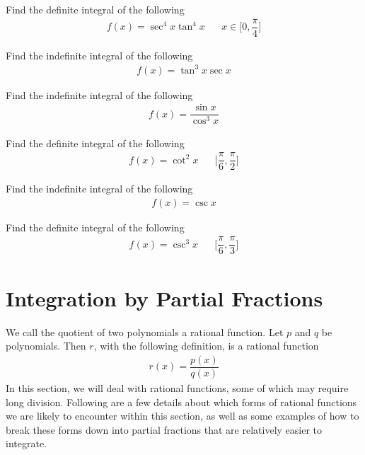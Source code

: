 \begin{exercise}
Find the definite integral of the following
\begin{align*}
    f(x) = \sec^{4} x \tan^{4} x \hspace{20pt} x \in \Big[0, \dfrac{\pi}{4} \Big]
\end{align*}
\end{exercise}

\begin{exercise}
Find the indefinite integral of the following
\begin{align*}
    f(x) = \tan^{3} x \sec x
\end{align*}
\end{exercise}

\begin{exercise}
Find the indefinite integral of the following
\begin{align*}
    f(x) = \dfrac{\sin x}{\cos^{3} x}
\end{align*}
\end{exercise}

\begin{exercise}
Find the definite integral of the following
\begin{align*}
    f(x) = \cot^{2} x \hspace{20pt} \Big[\dfrac{\pi}{6}, \dfrac{\pi}{2}\Big]
\end{align*}
\end{exercise}

\begin{exercise}
Find the indefinite integral of the following
\begin{align*}
    f(x) = \csc x
\end{align*}
\end{exercise}

\begin{exercise}
Find the definite integral of the following
\begin{align*}
    f(x) = \csc^{3} x \hspace{20pt} \Big[\dfrac{\pi}{6}, \dfrac{\pi}{3}\Big]
\end{align*}
\end{exercise}

\newpage
\section{Integration by Partial Fractions}

\begin{recall}
We call the quotient of two polynomials a rational function. Let $p$ and $q$ be polynomials. Then $r$, with the following definition, is a rational function
\begin{align*}
    r(x) = \dfrac{p(x)}{q(x)}
\end{align*}
In this section, we will deal with rational functions, some of which may require long division. Following are a few details about which forms of rational functions we are likely to encounter within this section, as well as some examples of how to break these forms down into partial fractions that are relatively easier to integrate.
\end{recall}

